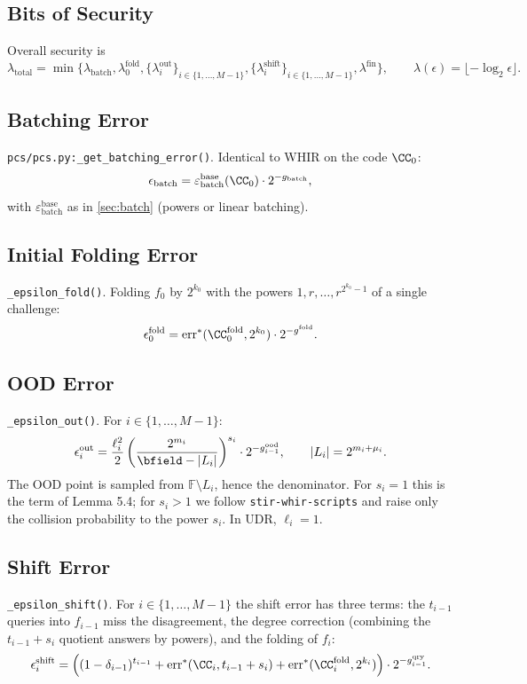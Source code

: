 \subsection{Bits of Security}

Overall security is
\[
  \lambda_{\mathrm{total}}
    = \min\{
      \lambda_{\mathrm{batch}},
      \lambda^{\mathrm{fold}}_{0},
      \{\lambda^{\mathrm{out}}_i\}_{i\in \{1,\ldots,M-1\}},
      \{\lambda^{\mathrm{shift}}_i\}_{i\in \{1,\ldots,M-1\}},
      \lambda^{\mathrm{fin}}
    \},
  \qquad \lambda(\epsilon) = \lfloor -\log_2 \epsilon \rfloor.
\]

\subsection{Batching Error}
\verb|pcs/pcs.py:_get_batching_error()|. Identical to WHIR on the code $\CC_0$:
\[
  \epsilon_{\mathrm{batch}} = \varepsilon^{\mathrm{base}}_{\mathrm{batch}}(\CC_0) \cdot 2^{-g_{\mathrm{batch}}},
\]
with $\varepsilon^{\mathrm{base}}_{\mathrm{batch}}$ as in \cref{sec:batch} (powers or linear batching).

\subsection{Initial Folding Error}
\verb|_epsilon_fold()|. Folding $f_0$ by $2^{k_0}$ with the powers $1, r, \ldots, r^{2^{k_0}-1}$ of a single challenge:
\[
  \epsilon^{\mathrm{fold}}_0 = \operatorname{err}^*(\CC_0^{\mathrm{fold}}, 2^{k_0}) \cdot 2^{-g^{\mathrm{fold}}}.
\]

\subsection{OOD Error}
\verb|_epsilon_out()|. For $i \in \{1,\ldots,M-1\}$:
\[
  \epsilon^{\mathrm{out}}_i = \frac{\ell_i^2}{2} \left(\frac{2^{m_i}}{\bfield - |L_i|}\right)^{s_i} \cdot 2^{-g^{\mathrm{ood}}_{i-1}},
  \qquad |L_i| = 2^{m_i + \mu_i}.
\]
The OOD point is sampled from $\mathbb{F} \setminus L_i$, hence the denominator. For $s_i = 1$ this is the term of Lemma 5.4; for $s_i > 1$ we follow \texttt{stir-whir-scripts} and raise only the collision probability to the power $s_i$. In UDR, $\ell_i = 1$.

\subsection{Shift Error}
\verb|_epsilon_shift()|. For $i \in \{1,\ldots,M-1\}$ the shift error has three terms: the $t_{i-1}$ queries into $f_{i-1}$ miss the disagreement, the degree correction (combining the $t_{i-1}+s_{i}$ quotient answers by powers), and the folding of $f_i$:
\[
  \epsilon^{\mathrm{shift}}_i
    = \Big( (1-\delta_{i-1})^{t_{i-1}}
      + \operatorname{err}^*(\CC_i, t_{i-1} + s_i)
      + \operatorname{err}^*(\CC_i^{\mathrm{fold}}, 2^{k_i}) \Big) \cdot 2^{-g^{\mathrm{qry}}_{i-1}}.
\]

